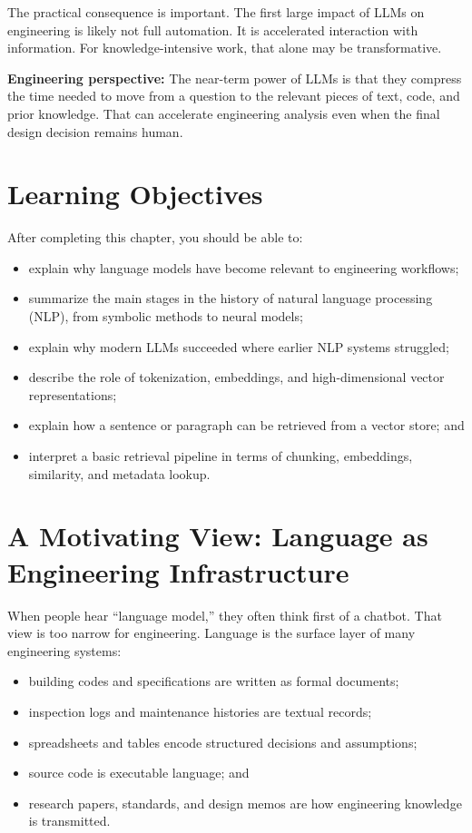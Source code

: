\documentclass[12pt]{article}
\begin{document}
The practical consequence is important. The first large impact of LLMs on engineering is likely not full automation. It is accelerated interaction with information. For knowledge-intensive work, that alone may be transformative.

\begin{alert-box}
\textbf{Engineering perspective:} The near-term power of LLMs is that they compress the time needed to move from a question to the relevant pieces of text, code, and prior knowledge. That can accelerate engineering analysis even when the final design decision remains human.
\end{alert-box}

\section*{Learning Objectives}
After completing this chapter, you should be able to:
\begin{itemize}
    \item explain why language models have become relevant to engineering workflows;
    \item summarize the main stages in the history of natural language processing (NLP), from symbolic methods to neural models;
    \item explain why modern LLMs succeeded where earlier NLP systems struggled;
    \item describe the role of tokenization, embeddings, and high-dimensional vector representations;
    \item explain how a sentence or paragraph can be retrieved from a vector store; and
    \item interpret a basic retrieval pipeline in terms of chunking, embeddings, similarity, and metadata lookup.
\end{itemize}

\section{A Motivating View: Language as Engineering Infrastructure}

When people hear ``language model,'' they often think first of a chatbot. That view is too narrow for engineering. Language is the surface layer of many engineering systems:

\begin{itemize}
    \item building codes and specifications are written as formal documents;
    \item inspection logs and maintenance histories are textual records;
    \item spreadsheets and tables encode structured decisions and assumptions;
    \item source code is executable language; and
    \item research papers, standards, and design memos are how engineering knowledge is transmitted.
\end{itemize}
\end{document}
